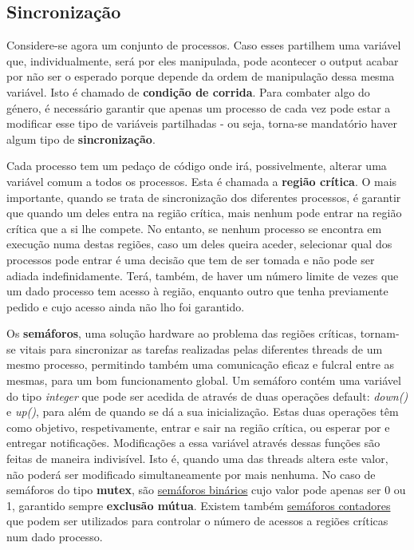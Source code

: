 \documentclass[10pt,portuguese]{article}
\begin{document}
\subsection{Sincronização}
\par Considere-se agora um conjunto de processos. Caso esses partilhem uma variável que, individualmente, será por eles manipulada, pode acontecer o output acabar por não ser o esperado porque depende da ordem de manipulação dessa mesma variável. Isto é chamado de \textbf{condição de corrida}. Para combater algo do género, é necessário garantir que apenas um processo de cada vez pode estar a modificar esse tipo de variáveis partilhadas - ou seja, torna-se mandatório haver algum tipo de \textbf{sincronização}.
\par Cada processo tem um pedaço de código onde irá, possivelmente, alterar uma variável comum a todos os processos. Esta é chamada a \textbf{região crítica}. O mais importante, quando se trata de sincronização dos diferentes processos, é garantir que quando um deles entra na região crítica, mais nenhum pode entrar na região crítica que a si lhe compete. No entanto, se nenhum processo se encontra em execução numa destas regiões, caso um deles queira aceder, selecionar qual dos processos pode entrar é uma decisão que tem de ser tomada e não pode ser adiada indefinidamente. Terá, também, de haver um número limite de vezes que um dado processo tem acesso à região, enquanto outro que tenha previamente pedido e cujo acesso ainda não lho foi garantido.
\par Os \textbf{semáforos}, uma solução hardware ao problema das regiões críticas, tornam-se vitais para sincronizar as tarefas realizadas pelas diferentes threads de um mesmo processo, permitindo também uma comunicação eficaz e fulcral entre as mesmas, para um bom funcionamento global. Um semáforo contém uma variável do tipo \textit{integer} que pode ser acedida de através de duas operações default: \textit{down()} e \textit{up()}, para além de quando se dá a sua inicialização. Estas duas operações têm como objetivo, respetivamente, entrar e sair na região crítica, ou esperar por e entregar notificações. Modificações a essa variável através dessas funções são feitas de maneira indivisível. Isto é, quando uma das threads altera este valor, não poderá ser modificado simultaneamente por mais nenhuma. No caso de semáforos do tipo \textbf{mutex}, são \underline{semáforos binários} cujo valor pode apenas ser 0 ou 1, garantido sempre \textbf{exclusão mútua}. Existem também \underline{semáforos contadores} que podem ser utilizados para controlar o número de acessos a regiões críticas num dado processo.
\end{document}
